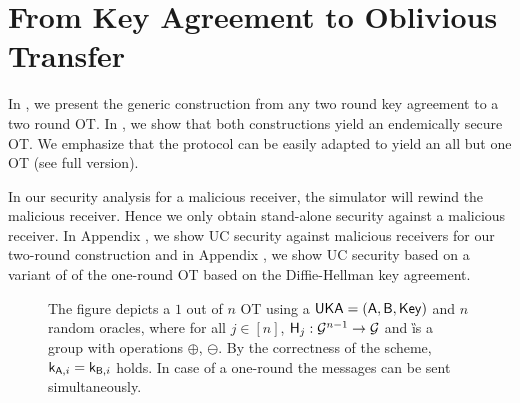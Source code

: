 \section{From Key Agreement to Oblivious Transfer}\label{sec:endemicOT}

In , we present the generic construction from any two round key agreement to a two round OT. In , we show that both constructions yield an endemically secure OT. We emphasize that the protocol can be easily adapted to yield an all but one OT (see \iffullversion{}\else full version\fi).

In our security analysis for a malicious receiver, the simulator will rewind the malicious receiver. Hence we only obtain stand-alone security against a malicious receiver. In Appendix , we show UC security against malicious receivers for our two-round construction and in Appendix , we show UC security based on a variant of \DDH of the one-round OT based on the Diffie-Hellman key agreement.


\begin{figure}
\centering
\scalebox{0.9}
{
}
\myvspace{-0.3cm}
\caption{The figure depicts a $1$ out of $n$ OT using a $\mathsf{UKA}=(\mathsf{A},\mathsf{B},\mathsf{Key})$ and $n$ random oracles, where for all $j\in[n]$, $\mathsf{H}_j:\mathcal{G}^{n-1}\rightarrow\mathcal{G}$ and \G is a group with operations $\oplus$, $\ominus$. By the correctness of the \UKA scheme, $\mathsf{k}_{\mathsf{A},i}=\mathsf{k}_{\mathsf{B},i}$ holds. In case of a one-round \UKA the messages can be sent simultaneously.}
\label{fig:KAtoOT}
\end{figure}


